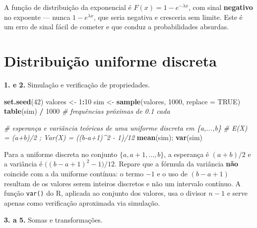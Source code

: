 \documentclass[
  portuguese,
  11pt,
  openany]{book}
\newenvironment{Shaded}{\begin{snugshade}}{\end{snugshade}}
\newcommand{\AttributeTok}[1]{\textcolor[rgb]{0.13,0.29,0.53}{#1}}
\newcommand{\CommentTok}[1]{\textcolor[rgb]{0.56,0.35,0.01}{\textit{#1}}}
\newcommand{\ConstantTok}[1]{\textcolor[rgb]{0.56,0.35,0.01}{#1}}
\newcommand{\DecValTok}[1]{\textcolor[rgb]{0.00,0.00,0.81}{#1}}
\newcommand{\FunctionTok}[1]{\textcolor[rgb]{0.13,0.29,0.53}{\textbf{#1}}}
\newcommand{\NormalTok}[1]{#1}
\newcommand{\OtherTok}[1]{\textcolor[rgb]{0.56,0.35,0.01}{#1}}
\newcommand{\SpecialCharTok}[1]{\textcolor[rgb]{0.81,0.36,0.00}{\textbf{#1}}}
\begin{document}
A função de distribuição da exponencial é \(F(x) = 1 - e^{-\lambda x}\), com sinal
\textbf{negativo} no expoente --- nunca \(1 - e^{\lambda x}\), que seria negativa e
cresceria sem limite. Este é um erro de sinal fácil de cometer e que conduz a
probabilidades absurdas.

\section{Distribuição uniforme discreta}\label{distribuiuxe7uxe3o-uniforme-discreta-1}

\textbf{1. e 2.} Simulação e verificação de propriedades.

\begin{Shaded}
\begin{Highlighting}[]
\FunctionTok{set.seed}\NormalTok{(}\DecValTok{42}\NormalTok{)}
\NormalTok{valores }\OtherTok{\textless{}{-}} \DecValTok{1}\SpecialCharTok{:}\DecValTok{10}
\NormalTok{sim }\OtherTok{\textless{}{-}} \FunctionTok{sample}\NormalTok{(valores, }\DecValTok{1000}\NormalTok{, }\AttributeTok{replace =} \ConstantTok{TRUE}\NormalTok{)}
\FunctionTok{table}\NormalTok{(sim) }\SpecialCharTok{/} \DecValTok{1000}                  \CommentTok{\# frequências próximas de 0.1 cada}

\CommentTok{\# esperança e variância teóricas de uma uniforme discreta em \{a,...,b\}}
\CommentTok{\# E(X) = (a+b)/2 ;  Var(X) = ((b{-}a+1)\^{}2 {-} 1)/12}
\FunctionTok{mean}\NormalTok{(sim); }\FunctionTok{var}\NormalTok{(sim)}
\end{Highlighting}
\end{Shaded}

Para a uniforme discreta no conjunto \(\{a, a+1, \ldots, b\}\), a esperança é
\((a+b)/2\) e a variância é \(\big((b-a+1)^2 - 1\big)/12\). Repare que a fórmula da
variância \textbf{não} coincide com a da uniforme contínua: o termo \(-1\) e o uso de
\((b-a+1)\) resultam de os valores serem inteiros discretos e não um intervalo
contínuo. A função \texttt{var()} do R, aplicada ao conjunto dos valores, usa o divisor
\(n-1\) e serve apenas como verificação aproximada via simulação.

\textbf{3. a 5.} Somas e transformações.
\end{document}
